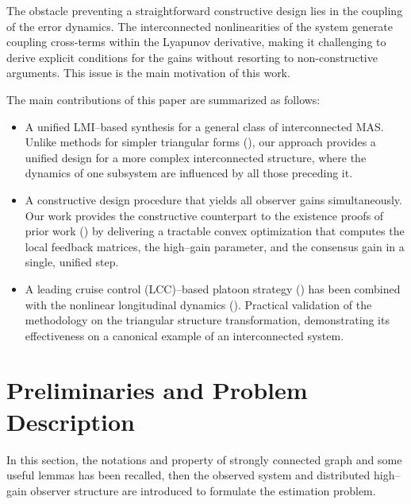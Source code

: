 \documentclass{ifacconf}
\begin{document}
The obstacle preventing a straightforward constructive design lies in the coupling of the error dynamics. The interconnected nonlinearities of the system generate coupling cross-terms within the Lyapunov derivative, making it challenging to derive explicit conditions for the gains without resorting to non-constructive arguments. This issue is the main motivation of this work.

The main contributions of this paper are summarized as follows:
\begin{itemize}[leftmargin=*]
    \item A unified LMI--based synthesis for a general class of interconnected MAS. Unlike methods for simpler triangular forms (\cite{meng2025distributed}), our approach provides a unified design for a more complex interconnected structure, where the dynamics of one subsystem are influenced by all those preceding it.
    \item A constructive design procedure that yields all observer gains simultaneously. Our work provides the constructive counterpart to the existence proofs of prior work (\cite{wu2021design}) by delivering a tractable convex optimization that computes the local feedback matrices, the high--gain parameter, and the consensus gain in a single, unified step.
    \item A leading cruise control (LCC)--based platoon strategy (\cite{wang2021leading}) has been combined with the nonlinear longitudinal dynamics (\cite{rajamani2006vehicle}). Practical validation of the methodology on the triangular structure transformation, demonstrating its effectiveness on a canonical example of an interconnected system.
\end{itemize}















\section{Preliminaries and Problem Description}\label{sec:pre}
\vspace*{-0.3 cm}
In this section, the notations and property of strongly connected graph and some useful lemmas has been recalled, then the observed system and distributed high--gain observer structure are introduced to formulate the estimation problem.
\end{document}
